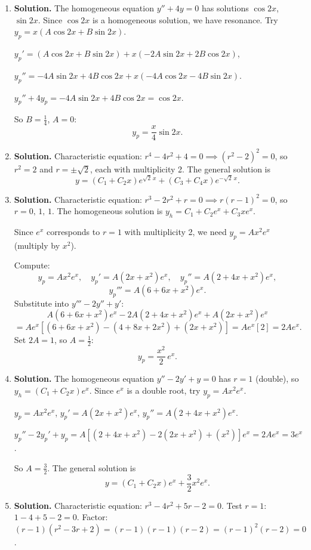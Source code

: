 \begin{enumerate}
$y'=e^{-x}[(-C_1+2C_2)\cos 2x+(-C_2-2C_1)\sin 2x]$. At $x=0$: $y'(0)=-C_1+2C_2=-2+2C_2=0$, so $C_2=1$.
\[
\boxed{y = e^{-x}(2\cos 2x+\sin 2x)}.
\]

\item \textbf{Solution.}
The homogeneous equation $y''+4y=0$ has solutions $\cos 2x$, $\sin 2x$. Since $\cos 2x$ is a homogeneous solution, we have resonance. Try $y_p=x(A\cos 2x+B\sin 2x)$.

$y_p'=(A\cos 2x+B\sin 2x)+x(-2A\sin 2x+2B\cos 2x)$,

$y_p''=-4A\sin 2x+4B\cos 2x + x(-4A\cos 2x-4B\sin 2x)$.

$y_p''+4y_p=-4A\sin 2x+4B\cos 2x = \cos 2x$.

So $B=\frac{1}{4}$, $A=0$:
\[
\boxed{y_p = \frac{x}{4}\sin 2x}.
\]

\item \textbf{Solution.}
Characteristic equation: $r^4-4r^2+4=0 \implies (r^2-2)^2=0$, so $r^2=2$ and $r=\pm\sqrt{2}$, each with multiplicity 2. The general solution is
\[
\boxed{y = (C_1+C_2 x)e^{\sqrt{2}\,x}+(C_3+C_4 x)e^{-\sqrt{2}\,x}}.
\]

\item \textbf{Solution.}
Characteristic equation: $r^3-2r^2+r=0 \implies r(r-1)^2=0$, so $r=0,\,1,\,1$. The homogeneous solution is $y_h=C_1+C_2 e^x+C_3 xe^x$.

Since $e^x$ corresponds to $r=1$ with multiplicity 2, we need $y_p=Ax^2 e^x$ (multiply by $x^2$).

Compute:
\[
y_p = Ax^2e^x, \quad y_p' = A(2x+x^2)e^x, \quad y_p'' = A(2+4x+x^2)e^x,
\]
\[
y_p''' = A(6+6x+x^2)e^x.
\]
Substitute into $y'''-2y''+y'$:
\[
A(6+6x+x^2)e^x - 2A(2+4x+x^2)e^x + A(2x+x^2)e^x
\]
\[
= Ae^x[(6+6x+x^2)-(4+8x+2x^2)+(2x+x^2)] = Ae^x[2] = 2Ae^x.
\]
Set $2A=1$, so $A=\frac{1}{2}$:
\[
\boxed{y_p = \frac{x^2}{2}\,e^x}.
\]

\item \textbf{Solution.}
The homogeneous equation $y''-2y'+y=0$ has $r=1$ (double), so $y_h=(C_1+C_2 x)e^x$. Since $e^x$ is a double root, try $y_p=Ax^2 e^x$.

$y_p=Ax^2 e^x$, $y_p'=A(2x+x^2)e^x$, $y_p''=A(2+4x+x^2)e^x$.

$y_p''-2y_p'+y_p = A[(2+4x+x^2)-2(2x+x^2)+(x^2)]e^x = 2Ae^x = 3e^x$.

So $A=\frac{3}{2}$. The general solution is
\[
\boxed{y = (C_1+C_2 x)e^x+\frac{3}{2}x^2 e^x}.
\]

\item \textbf{Solution.}
Characteristic equation: $r^3-4r^2+5r-2=0$. Test $r=1$: $1-4+5-2=0$. Factor: $(r-1)(r^2-3r+2)=(r-1)(r-1)(r-2)=(r-1)^2(r-2)=0$.


\end{enumerate}
